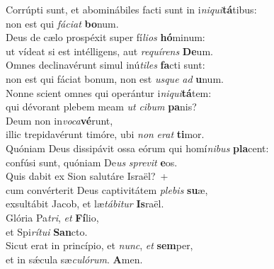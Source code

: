 \evenverse Corrúpti sunt, et abominábiles facti sunt in i\textit{ni}\textit{qui}\textbf{tá}tibus:~\*\\
\evenverse non est qui \textit{fá}\textit{ci}\textit{at} \textbf{bo}num.\\
\oddverse Deus de cælo prospéxit super fí\textit{li}\textit{os} \textbf{hó}minum:~\*\\
\oddverse ut vídeat si est intélligens, aut \textit{re}\textit{quí}\textit{rens} \textbf{De}um.\\
\evenverse Omnes declinavérunt simul inú\textit{ti}\textit{les} \textbf{fa}cti sunt:~\*\\
\evenverse non est qui fáciat bonum, non est \textit{us}\textit{que} \textit{ad} \textbf{u}num.\\
\oddverse Nonne scient omnes qui operántur i\textit{ni}\textit{qui}\textbf{tá}tem:~\*\\
\oddverse qui dévorant plebem meam \textit{ut} \textit{ci}\textit{bum} \textbf{pa}nis?\\
\evenverse Deum non in\textit{vo}\textit{ca}\textbf{vé}runt,~\*\\
\evenverse illic trepidavérunt timóre, ubi \textit{non} \textit{e}\textit{rat} \textbf{ti}mor.\\
\oddverse Quóniam Deus dissipávit ossa eórum qui homí\textit{ni}\textit{bus} \textbf{pla}cent:~\*\\
\oddverse confúsi sunt, quóniam De\textit{us} \textit{spre}\textit{vit} \textbf{e}os.\\
\evenverse Quis dabit ex Sion salutáre Israël?~+\\
\evenverse  cum convérterit Deus captivitátem \textit{ple}\textit{bis} \textbf{su}æ,~\*\\
\evenverse exsultábit Jacob, et læ\textit{tá}\textit{bi}\textit{tur} \textbf{Is}raël.\\
\oddverse Glória Pa\textit{tri}, \textit{et} \textbf{Fí}lio,~\*\\
\oddverse et Spi\textit{rí}\textit{tu}\textit{i} \textbf{San}cto.\\
\evenverse Sicut erat in princípio, et \textit{nunc}, \textit{et} \textbf{sem}per,~\*\\
\evenverse et in sǽcula sæ\textit{cu}\textit{ló}\textit{rum}. \textbf{A}men.\\
